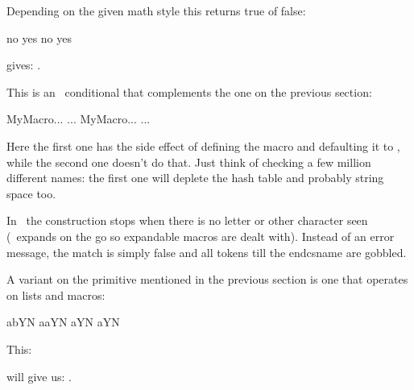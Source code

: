 \stopnewprimitive

\startnewprimitive[title={\prm {ifcramped}}]

Depending on the given math style this returns true of false:

\startbuffer
\ifcramped\mathstyle        no  \fi
\ifcramped\crampedtextstyle yes \fi
\ifcramped\textstyle        no  \fi
\ifcramped\displaystyle     yes \fi
\stopbuffer

\typebuffer

gives: \inlinebuffer.

\stopnewprimitive

\startoldprimitive[title={\prm {ifcsname}}]

This is an \ETEX\ conditional that complements the one on the previous section:

\starttyping
\expandafter\ifx\csname MyMacro\endcsname\relax ... \else ... \fi
            \ifcsname   MyMacro\endcsname       ... \else ... \fi
\stoptyping

Here the first one has the side effect of defining the macro and defaulting it to
, while the second one doesn't do that. Just think of checking a
few million different names: the first one will deplete the hash table and
probably string space too.

In \LUAMETATEX\ the construction stops when there is no letter or other character
seen (\TEX\ expands on the go so expandable macros are dealt with). Instead of an
error message, the match is simply false and all tokens till the \prm
{endcsname} are gobbled.

\stopoldprimitive

\startnewprimitive[title={\prm {ifcstok}}]

A variant on the primitive mentioned in the previous section is one that
operates on lists and macros:

\startbuffer[a]
 \def\b{b} \def\c{a}
\stopbuffer

\typebuffer[a]

\startbuffer[b]
\ifcstok\a\b   Y\else N\fi\space
\ifcstok\a\c   Y\else N\fi\space
\ifcstok{\a}\c Y\else N\fi\space
{}\c  Y\else N\fi
\stopbuffer

This:

\typebuffer[b]

{\getbuffer[a]will give us: \inlinebuffer[b].}

\stopnewprimitive

\startoldprimitive[title={\prm {ifdefined}}]

